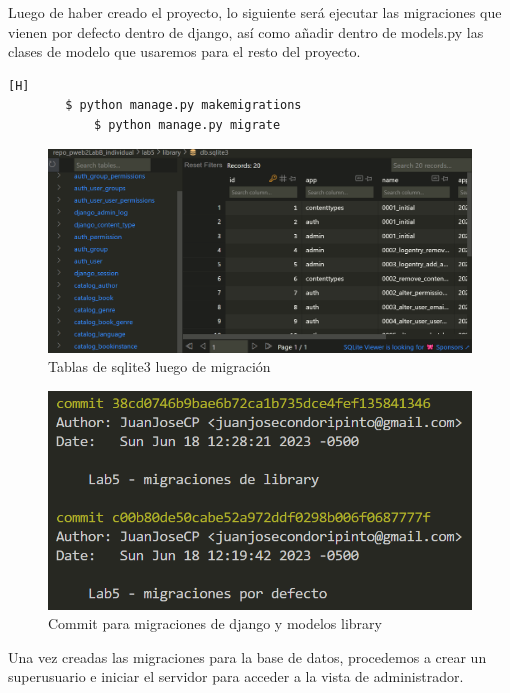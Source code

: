 \documentclass{article}
\begin{document}
    Luego de haber creado el proyecto, lo siguiente será ejecutar las migraciones que vienen por defecto dentro de django, así como añadir dentro de models.py las clases de modelo que usaremos para el resto del proyecto.

	\begin{lstlisting}[language=bash,caption={Realizando migraciones}][H]
		$ python manage.py makemigrations
            $ python manage.py migrate
	\end{lstlisting}

    \begin{figure}[H]
        \centering
        \includegraphics[scale=0.5]{img/img1.png}
        \caption{Tablas de sqlite3 luego de migración}
        \label{fig:imagen}
    \end{figure}

    \begin{figure}[H]
        \centering
        \includegraphics[scale=0.5]{img/img1_commit.png}
        \caption{Commit para migraciones de django y modelos library}
        \label{fig:imagen}
    \end{figure}

    Una vez creadas las migraciones para la base de datos, procedemos a crear un superusuario e iniciar el servidor para acceder a la vista de administrador.
\end{document}
